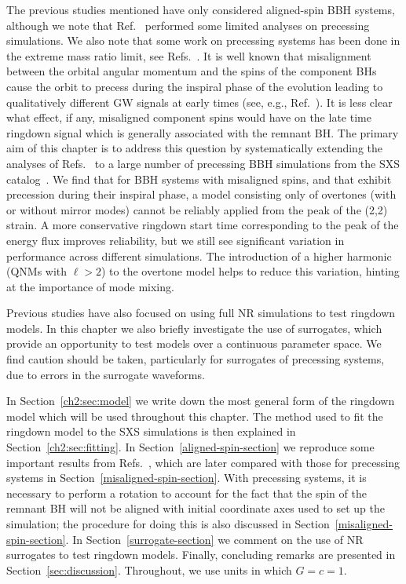 The previous studies mentioned have only considered aligned-spin BBH systems, although we note that Ref.~\cite{Kamaretsos:2012bs} performed some limited analyses on precessing simulations.
We also note that some work on precessing systems has been done in the extreme mass ratio limit, see Refs.~\cite{Hughes:2019zmt,Lim:2019xrb,Lim:2022veo}.
It is well known that misalignment between the orbital angular momentum and the spins of the component BHs cause the orbit to precess during the inspiral phase of the evolution leading to qualitatively different GW signals at early times (see, e.g., Ref.~\cite{Apostolatos:1994mx}). 
It is less clear what effect, if any, misaligned component spins would have on the late time ringdown signal which is generally associated with the remnant BH. 
The primary aim of this chapter is to address this question by systematically extending the analyses of Refs.~\cite{Giesler:2019uxc, Dhani:2020nik} to a large number of precessing BBH simulations from the SXS catalog~\cite{Boyle:2019kee}. 
We find that for BBH systems with misaligned spins, and that exhibit precession during their inspiral phase, a model consisting only of overtones (with or without mirror modes) cannot be reliably applied from the peak of the (2,2) strain. 
A more conservative ringdown start time corresponding to the peak of the energy flux improves reliability, but we still see significant variation in performance across different simulations. 
The introduction of a higher harmonic (QNMs with $\ell > 2$) to the overtone model helps to reduce this variation, hinting at the importance of mode mixing.

Previous studies have also focused on using full NR simulations to test ringdown models. 
In this chapter we also briefly investigate the use of surrogates, which provide an opportunity to test models over a continuous parameter space. 
We find caution should be taken, particularly for surrogates of precessing systems, due to errors in the surrogate waveforms.

In Section~\ref{ch2:sec:model} we write down the most general form of the ringdown model which will be used throughout this chapter.
The method used to fit the ringdown model to the SXS simulations is then explained in Section~\ref{ch2:sec:fitting}.
In Section~\ref{aligned-spin-section} we reproduce some important results from Refs.~\cite{Giesler:2019uxc, Dhani:2020nik}, which are later compared with those for precessing systems in Section~\ref{misaligned-spin-section}. 
With precessing systems, it is necessary to perform a rotation to account for the fact that the spin of the remnant BH will not be aligned with initial coordinate axes used to set up the simulation; the procedure for doing this is also discussed in Section~\ref{misaligned-spin-section}. 
In Section~\ref{surrogate-section} we comment on the use of NR surrogates to test ringdown models. 
Finally, concluding remarks are presented in Section~\ref{sec:discussion}. 
Throughout, we use units in which $G=c=1$.

